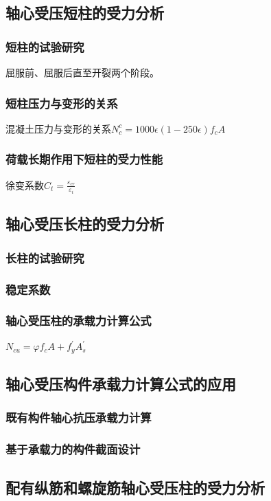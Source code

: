 \documentclass{article}
\begin{document}
\subsection{轴心受压短柱的受力分析}
\subsubsection{短柱的试验研究}
\par 屈服前、屈服后直至开裂两个阶段。
\subsubsection{短柱压力与变形的关系}
\par 混凝土压力与变形的关系$N_c^c=1000\epsilon(1-250\epsilon)f_cA$
\subsubsection{荷载长期作用下短柱的受力性能}
\par 徐变系数$C_t=\frac{\varepsilon_{cr}}{\varepsilon_i}$
\subsection{轴心受压长柱的受力分析}
\subsubsection{长柱的试验研究}
\subsubsection{稳定系数}
\subsubsection{轴心受压柱的承载力计算公式}
\par $N_{cu}=\varphi f_cA+f_y^{\prime}A_s^{\prime}$
\subsection{轴心受压构件承载力计算公式的应用}
\subsubsection{既有构件轴心抗压承载力计算}
\subsubsection{基于承载力的构件截面设计}
\subsection{配有纵筋和螺旋筋轴心受压柱的受力分析}
\end{document}

